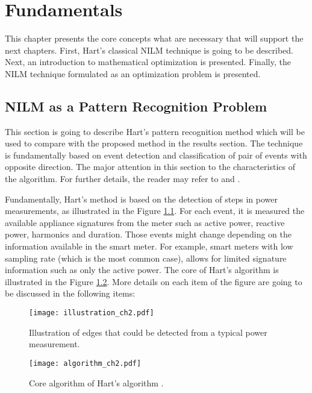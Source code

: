 \chapter{Fundamentals}

This chapter presents the core concepts what are necessary that will support the next chapters. First, Hart's classical NILM technique is going to be described. Next, an introduction to mathematical optimization is presented. Finally, the NILM technique formulated as an optimization problem is presented. 

\section{NILM as a Pattern Recognition Problem}
This section is going to describe Hart's pattern recognition method which will be used to compare with the proposed method in the results section. The technique is fundamentally based on event detection and classification of pair of events with opposite direction. The major attention in this section to the characteristics of the algorithm. For further details, the reader may refer to \cite{hart} and \cite{hart85}. 

Fundamentally, Hart's method is based on the detection of steps in power measurements, as illustrated in the Figure \ref{illustration_ch2}. For each event, it is measured the available appliance signatures from the meter such as active power, reactive power, harmonics and duration. Those events might change depending on the information available in the smart meter. For example, smart meters with low sampling rate (which is the most common case), allows for limited signature information such as only the active power. The core of Hart's algorithm is illustrated in the Figure \ref{algorithm_ch2}. More details on each item of the figure are going to be discussed in the following items:

\begin{figure}[htb]
    \centering
    \texttt{[image: illustration\_ch2.pdf]}
    \caption{Illustration of edges that could be detected from a typical power measurement.}
    \label{illustration_ch2}
\end{figure}



\begin{figure}[htb]
    \centering
    \texttt{[image: algorithm\_ch2.pdf]}
    \caption{Core algorithm of Hart's algorithm \cite{hart}.}
    \label{algorithm_ch2}
\end{figure}

